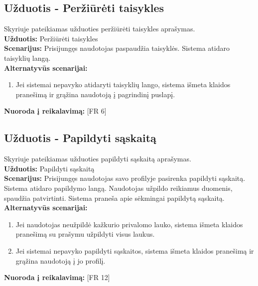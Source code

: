 \documentclass{VUMIFPSkursinis}
\begin{document}
	\subsection{Užduotis - Peržiūrėti taisykles}
	Skyriuje pateikiamas užduoties peržiūrėti taisykles aprašymas.\\
	\textbf{Užduotis:}  Peržiūrėti taisykles \\
	\textbf{Scenarijus:}  Prisijungęs naudotojas paspaudžia taisyklės. Sistema atidaro taisyklių langą. \\
	\textbf{Alternatyvūs scenarijai:}
	\begin{enumerate}
		\item Jei sistemai nepavyko atidaryti taisyklių lango, sistema išmeta klaidos pranešimą ir grąžina naudotoją į pagrindinį puslapį. 
	\end{enumerate}
	\textbf{Nuoroda į reikalavimą: } [FR 6]
	
	\subsection{Užduotis - Papildyti sąskaitą}
	Skyriuje pateikiamas užduoties papildyti sąskaitą aprašymas.\\
	\textbf{Užduotis:}  Papildyti sąskaitą \\
	\textbf{Scenarijus:}  Prisijungęs naudotojas savo profilyje pasirenka papildyti sąskaitą. Sistema atidaro papildymo langą. Naudotojas užpildo reikiamus duomenis, spaudžia patvirtinti. Sistema praneša apie sėkmingai papildytą sąskaitą.  \\
	\textbf{Alternatyvūs scenarijai:}
	\begin{enumerate}
		\item Jei naudotojas neužpildė kažkurio privalomo lauko, sistema išmeta klaidos pranešimą su prašymu užpildyti visus laukus. 
		\item Jei sistemai nepavyko papildyti sąskaitos, sistema išmeta klaidos pranešimą ir grąžina naudotoją į jo profilį. 
	\end{enumerate}
	\textbf{Nuoroda į reikalavimą: } [FR 12]
	
\end{document}
